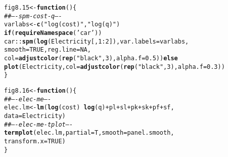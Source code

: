 \documentclass[12pt, a4paper,  BCOR=8.25mm, DIV=15]{scrartcl}\usepackage[]{graphicx}\usepackage[]{color}
\makeatletter
\newcommand{\hlnum}[1]{\textcolor[rgb]{0.686,0.059,0.569}{#1}}%
\newcommand{\hlstr}[1]{\textcolor[rgb]{0.192,0.494,0.8}{#1}}%
\newcommand{\hlcom}[1]{\textcolor[rgb]{0.678,0.584,0.686}{\textit{#1}}}%
\newcommand{\hlopt}[1]{\textcolor[rgb]{0,0,0}{#1}}%
\newcommand{\hlstd}[1]{\textcolor[rgb]{0.345,0.345,0.345}{#1}}%
\newcommand{\hlkwa}[1]{\textcolor[rgb]{0.161,0.373,0.58}{\textbf{#1}}}%
\newcommand{\hlkwb}[1]{\textcolor[rgb]{0.69,0.353,0.396}{#1}}%
\newcommand{\hlkwc}[1]{\textcolor[rgb]{0.333,0.667,0.333}{#1}}%
\newcommand{\hlkwd}[1]{\textcolor[rgb]{0.737,0.353,0.396}{\textbf{#1}}}%
\newenvironment{kframe}{%
 \def\at@end@of@kframe{}%
 \ifinner\ifhmode%
  \def\at@end@of@kframe{\end{minipage}}%
  \begin{minipage}{\columnwidth}%
 \fi\fi%
 \def\FrameCommand##1{\hskip\@totalleftmargin \hskip-\fboxsep
 \colorbox{shadecolor}{##1}\hskip-\fboxsep
     \hskip-\linewidth \hskip-\@totalleftmargin \hskip\columnwidth}%
 \MakeFramed {\advance\hsize-\width
   \@totalleftmargin\z@ \linewidth\hsize
   \@setminipage}}%
 {\par\unskip\endMakeFramed%
 \at@end@of@kframe}
\newenvironment{knitrout}{}{} %
\makeatother
\begin{document}
\begin{knitrout}
\color{fgcolor}\begin{kframe}
\begin{alltt}
\hlstd{fig8.15} \hlkwb{<-} \hlkwa{function}\hlstd{()\{}
\hlcom{## ---- spm-cost-q ----}
\hlstd{varlabs} \hlkwb{<-} \hlkwd{c}\hlstd{(}\hlstr{"log(cost)"}\hlstd{,} \hlstr{"log(q)"}\hlstd{)}
\hlkwa{if}\hlstd{(}\hlkwd{requireNamespace}\hlstd{(}\hlstr{'car'}\hlstd{))}
\hlstd{car}\hlopt{::}\hlkwd{spm}\hlstd{(}\hlkwd{log}\hlstd{(Electricity[,}\hlnum{1}\hlopt{:}\hlnum{2}\hlstd{]),} \hlkwc{var.labels}\hlstd{=varlabs,}
    \hlkwc{smooth}\hlstd{=}\hlnum{TRUE}\hlstd{,} \hlkwc{reg.line}\hlstd{=}\hlnum{NA}\hlstd{,}
    \hlkwc{col}\hlstd{=}\hlkwd{adjustcolor}\hlstd{(}\hlkwd{rep}\hlstd{(}\hlstr{"black"}\hlstd{,}\hlnum{3}\hlstd{),} \hlkwc{alpha.f}\hlstd{=}\hlnum{0.5}\hlstd{))} \hlkwa{else}
    \hlkwd{plot}\hlstd{(Electricity,} \hlkwc{col}\hlstd{=}\hlkwd{adjustcolor}\hlstd{(}\hlkwd{rep}\hlstd{(}\hlstr{"black"}\hlstd{,}\hlnum{3}\hlstd{),} \hlkwc{alpha.f}\hlstd{=}\hlnum{0.3}\hlstd{))}
\hlstd{\}}
\end{alltt}
\end{kframe}
\end{knitrout}

\begin{knitrout}
\color{fgcolor}\begin{kframe}
\begin{alltt}
\hlstd{fig8.16} \hlkwb{<-} \hlkwa{function}\hlstd{()\{}
\hlcom{## ---- elec-me ----}
\hlstd{elec.lm} \hlkwb{<-} \hlkwd{lm}\hlstd{(}\hlkwd{log}\hlstd{(cost)} \hlopt{~} \hlkwd{log}\hlstd{(q)}\hlopt{+}\hlstd{pl}\hlopt{+}\hlstd{sl}\hlopt{+}\hlstd{pk}\hlopt{+}\hlstd{sk}\hlopt{+}\hlstd{pf}\hlopt{+}\hlstd{sf,}
              \hlkwc{data}\hlstd{=Electricity)}
\hlcom{## ---- elec-me-tplot ----}
\hlkwd{termplot}\hlstd{(elec.lm,} \hlkwc{partial}\hlstd{=T,} \hlkwc{smooth}\hlstd{=panel.smooth,}
         \hlkwc{transform.x}\hlstd{=}\hlnum{TRUE}\hlstd{)}
\hlstd{\}}
\end{alltt}
\end{kframe}
\end{knitrout}
\end{document}
